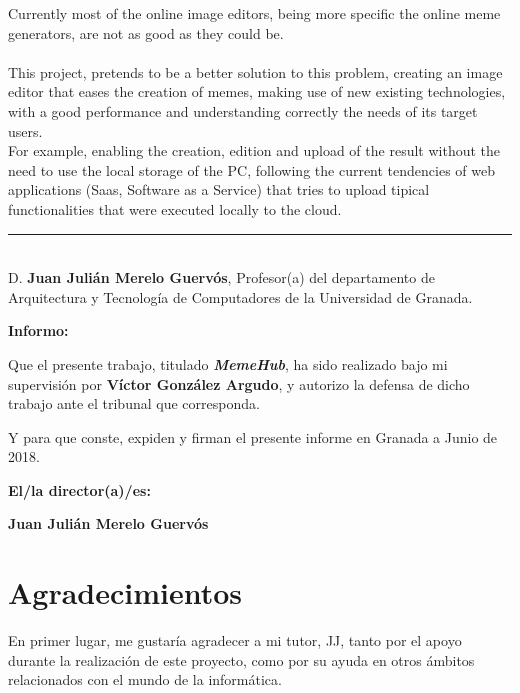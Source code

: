 	Currently most of the online image editors, being more specific the online meme generators, are
	not as good as they could be. 
	\\\\
	This project, pretends to be a better solution to this problem, creating an image editor that
	eases the creation of memes, making use of new existing technologies, with a good performance
	and understanding correctly the needs of its target users.
	\\
	For example, enabling the creation, edition and upload of the result without the need to use
	the local storage of the PC, following the current tendencies of web applications (Saas, Software as a Service)
	that tries to upload tipical functionalities that were executed locally to the cloud.

\cleardoublepage

\thispagestyle{empty}

\noindent\rule[-1ex]{\textwidth}{2pt}\\[4.5ex]

D. \textbf{Juan Julián Merelo Guervós}, Profesor(a) del departamento de Arquitectura y Tecnología de 
Computadores de la Universidad de Granada.

\vspace{0.5cm}

\textbf{Informo:}

\vspace{0.5cm}

Que el presente trabajo, titulado \textit{\textbf{MemeHub}},
ha sido realizado bajo mi supervisión por \textbf{Víctor González Argudo}, y autorizo la defensa de dicho trabajo ante el tribunal
que corresponda.

\vspace{0.5cm}

Y para que conste, expiden y firman el presente informe en Granada a Junio de 2018.

\vspace{1cm}

\textbf{El/la director(a)/es: }

\vspace{5cm}

\noindent \textbf{Juan Julián Merelo Guervós}

\chapter*{Agradecimientos}

En primer lugar, me gustaría agradecer a mi tutor, JJ, tanto por el apoyo durante la realización
de este proyecto, como por su ayuda en otros ámbitos relacionados con el mundo de la informática.
\\\\


